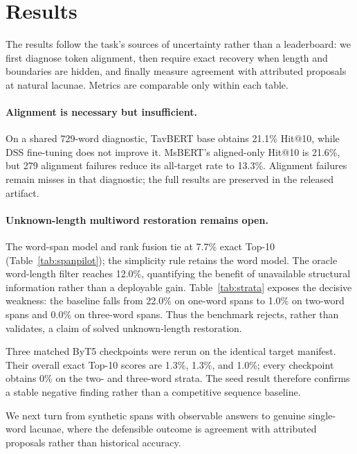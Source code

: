 \documentclass[10pt,twocolumn,a4paper]{article}
\begin{document}
\section{Results}

The results follow the task's sources of uncertainty rather than a leaderboard: we first diagnose token alignment, then require exact recovery when length and boundaries are hidden, and finally measure agreement with attributed proposals at natural lacunae. Metrics are comparable only within each table.

\paragraph{Alignment is necessary but insufficient.}
On a shared 729-word diagnostic, TavBERT base obtains 21.1\% Hit@10, while DSS fine-tuning does not improve it. MsBERT's aligned-only Hit@10 is 21.6\%, but 279 alignment failures reduce its all-target rate to 13.3\%. Alignment failures remain misses in that diagnostic; the full results are preserved in the released artifact.

\SpanPilotTable
\SpanStrataTable

\paragraph{Unknown-length multiword restoration remains open.}
The word-span model and rank fusion tie at 7.7\% exact Top-10 (Table~\ref{tab:spanpilot}); the simplicity rule retains the word model. The oracle word-length filter reaches 12.0\%, quantifying the benefit of unavailable structural information rather than a deployable gain. Table~\ref{tab:strata} exposes the decisive weakness: the baseline falls from 22.0\% on one-word spans to 1.0\% on two-word spans and 0.0\% on three-word spans. Thus the benchmark rejects, rather than validates, a claim of solved unknown-length restoration.

Three matched ByT5 checkpoints were rerun on the identical target manifest. Their overall exact Top-10 scores are 1.3\%, 1.3\%, and 1.0\%; every checkpoint obtains 0\% on the two- and three-word strata. The seed result therefore confirms a stable negative finding rather than a competitive sequence baseline.

We next turn from synthetic spans with observable answers to genuine single-word lacunae, where the defensible outcome is agreement with attributed proposals rather than historical accuracy.

\QDTable
\end{document}
